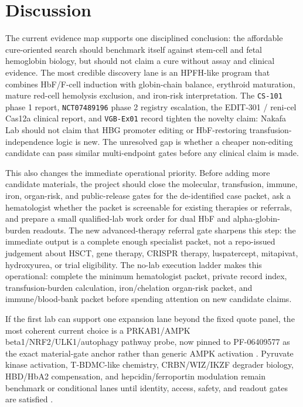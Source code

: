 \section{Discussion}

The current evidence map supports one disciplined conclusion: the affordable
cure-oriented search should benchmark itself against stem-cell and fetal
hemoglobin biology, but should not claim a cure without assay and clinical
evidence. The most credible discovery lane is an HPFH-like program that combines
HbF/F-cell induction with globin-chain balance, erythroid maturation, mature
red-cell hemolysis exclusion, and iron-risk interpretation. The
\texttt{CS-101} phase 1 report, \texttt{NCT07489196} phase 2 registry
escalation, the EDIT-301 / reni-cel Cas12a clinical report, and
\texttt{VGB-Ex01} record tighten the novelty claim: Nakafa Lab should not
claim that HBG promoter editing or HbF-restoring transfusion-independence logic
is new. The unresolved gap is whether a cheaper non-editing candidate can pass
similar multi-endpoint gates before any clinical claim is made.

This also changes the immediate operational priority. Before adding more
candidate materials, the project should close the molecular, transfusion,
immune, iron, organ-risk, and public-release gates for the de-identified case
packet, ask a hematologist whether the packet is screenable for existing
therapies or referrals, and prepare a small qualified-lab work order for dual
HbF and alpha-globin-burden readouts.
The new advanced-therapy referral gate sharpens this step: the immediate output
is a complete enough specialist packet, not a repo-issued judgement about HSCT,
gene therapy, CRISPR therapy, luspatercept, mitapivat, hydroxyurea, or trial
eligibility.
The no-lab execution ladder makes this operational: complete the minimum
hematologist packet, private record index, transfusion-burden calculation,
iron/chelation organ-risk packet, and immune/blood-bank packet before spending
attention on new candidate claims.

If the first lab can support one expansion lane beyond the fixed quote panel,
the most coherent current choice is a PRKAB1/AMPK beta1/NRF2/ULK1/autophagy
pathway probe, now pinned to PF-06409577 as the exact material-gate anchor
rather than generic AMPK activation \cite{hara2025ampkb1,zurlo2023sirolimusUlk1}.
Pyruvate kinase
activation, T-BDMC-like chemistry, CRBN/WIZ/IKZF degrader biology, HBD/HbA2
compensation, and hepcidin/ferroportin modulation remain benchmark or
conditional lanes until identity, access, safety, and readout gates are
satisfied
\cite{taher2025energize,nuamsee2021curcuminoids,ting2024wizGlue,khamphikham2020pomalidomide,boontanrart2023hbdPromoterHba2,taher2025vamifeportPhase2a}.


